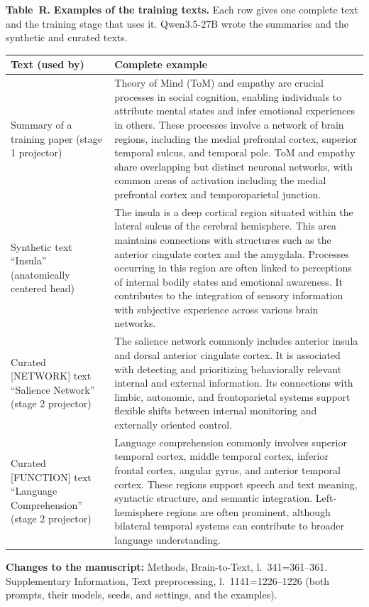 \documentclass[11pt]{article}
\renewcommand{\thetable}{R\arabic{table}}
\newcommand{\revchanges}[1]{\par{\small\raggedright\textbf{Changes to the manuscript:} #1\par}}  %
\providecommand{\mslink}[2]{#2}
\newcommand{\msl}[2]{\begingroup\edef\x{\endgroup\noexpand\mslink{\number\numexpr(#1+22)/46\relax}}%
  \x{\mbox{l.~#1\ifnum#1=#2\else--#2\fi}}}
\newcommand{\rtab}[2]{\par\begin{center}\refstepcounter{table}\begin{minipage}{\linewidth}\centering
  \parbox{\linewidth}{\footnotesize\textbf{Table~\thetable.} #1}\par\smallskip#2\end{minipage}\end{center}}
\begin{document}
\rtab{\textbf{Examples of the training texts.} Each row gives one complete text and the training stage that uses it. Qwen3.5-27B wrote the summaries and the synthetic and curated texts.\label{tab:examples}}{\small\begin{tabular}{p{3.6cm}p{12.3cm}}\toprule
\textbf{Text (used by)} & \textbf{Complete example} \\\midrule
Summary of a training paper (stage 1 projector) & Theory of Mind (ToM) and empathy are crucial processes in social cognition, enabling individuals to attribute mental states and infer emotional experiences in others. These processes involve a network of brain regions, including the medial prefrontal cortex, superior temporal sulcus, and temporal pole. ToM and empathy share overlapping but distinct neuronal networks, with common areas of activation including the medial prefrontal cortex and temporoparietal junction. \\
Synthetic text ``Insula'' (anatomically centered head) & The insula is a deep cortical region situated within the lateral sulcus of the cerebral hemisphere. This area maintains connections with structures such as the anterior cingulate cortex and the amygdala. Processes occurring in this region are often linked to perceptions of internal bodily states and emotional awareness. It contributes to the integration of sensory information with subjective experience across various brain networks. \\
Curated {[}NETWORK{]} text ``Salience Network'' (stage 2 projector) & The salience network commonly includes anterior insula and dorsal anterior cingulate cortex. It is associated with detecting and prioritizing behaviorally relevant internal and external information. Its connections with limbic, autonomic, and frontoparietal systems support flexible shifts between internal monitoring and externally oriented control. \\
Curated {[}FUNCTION{]} text ``Language Comprehension'' (stage 2 projector) & Language comprehension commonly involves superior temporal cortex, middle temporal cortex, inferior frontal cortex, angular gyrus, and anterior temporal cortex. These regions support speech and text meaning, syntactic structure, and semantic integration. Left-hemisphere regions are often prominent, although bilateral temporal systems can contribute to broader language understanding. \\
\bottomrule\end{tabular}}
\revchanges{Methods, Brain-to-Text, \msl{341}{361}. Supplementary Information, Text preprocessing, \msl{1141}{1226} (both prompts, their models, seeds, and settings, and the examples).}
\end{document}
